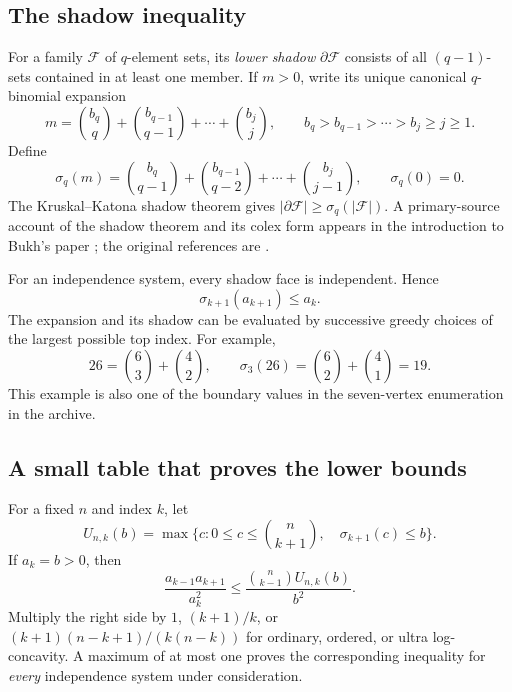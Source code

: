 \documentclass[11pt,letterpaper]{article}
\numberwithin{equation}{section}
\theoremstyle{definition}
\theoremstyle{remark}
\begin{document}
\subsection{The shadow inequality}
For a family $\mathcal F$ of $q$-element sets, its \emph{lower shadow}
$\partial\mathcal F$ consists of all $(q-1)$-sets contained in at least
one member. If $m>0$, write its unique canonical $q$-binomial expansion
\begin{equation}\label{eq:KK-expansion}
 m=\binom{b_q}{q}+\binom{b_{q-1}}{q-1}+\cdots+\binom{b_j}{j},
 \qquad b_q>b_{q-1}>\cdots>b_j\ge j\ge1.
\end{equation}
Define
\begin{equation}\label{eq:shadow}
 \sigma_q(m)=\binom{b_q}{q-1}+\binom{b_{q-1}}{q-2}
 +\cdots+\binom{b_j}{j-1},\qquad \sigma_q(0)=0.
\end{equation}
The Kruskal--Katona shadow theorem gives
$|\partial\mathcal F|\ge\sigma_q(|\mathcal F|)$.
A primary-source account of the shadow theorem and its colex form appears
in the introduction to Bukh's paper \cite{Bukh}; the original references
are \cite{Kruskal,Katona}.

For an independence system, every shadow face is independent. Hence
\begin{equation}\label{eq:KK-needed}
 \sigma_{k+1}(a_{k+1})\le a_k.
\end{equation}
The expansion and its shadow can be evaluated by successive greedy choices
of the largest possible top index. For example,
\[
 26=\binom63+\binom42,\qquad
 \sigma_3(26)=\binom62+\binom41=19.
\]
This example is also one of the boundary values in the seven-vertex
enumeration in the archive.

\subsection{A small table that proves the lower bounds}
For a fixed $n$ and index $k$, let
\begin{equation}\label{eq:U}
 U_{n,k}(b)=\max\{c:0\le c\le\binom n{k+1},\quad
                         \sigma_{k+1}(c)\le b\}.
\end{equation}
If $a_k=b>0$, then
\begin{equation}\label{eq:ratio-bound}
 \frac{a_{k-1}a_{k+1}}{a_k^2}
 \le \frac{\binom n{k-1}U_{n,k}(b)}{b^2}.
\end{equation}
Multiply the right side by $1$, $(k+1)/k$, or
$(k+1)(n-k+1)/(k(n-k))$ for ordinary, ordered, or ultra log-concavity.
A maximum of at most one proves the corresponding inequality for
\emph{every} independence system under consideration.
\end{document}
